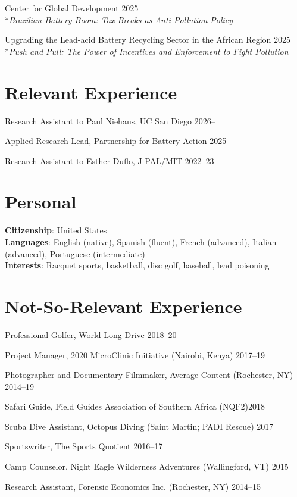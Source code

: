 \documentclass[12pt]{article}
\newcommand{\indentedline}[1]{%
    \\*\setlength{\parindent}{2em}\indent#1\setlength{\parindent}{0pt}%
    \vspace{0.5\baselineskip}%
}
\begin{document}
Center for Global Development \hfill 2025
\indentedline{\textit{Brazilian Battery Boom: Tax Breaks as Anti-Pollution Policy}}

Upgrading the Lead-acid Battery Recycling Sector in the African Region \hfill 2025
\indentedline{\textit{Push and Pull: The Power of Incentives and Enforcement to Fight Pollution}}

\section*{Relevant Experience}
Research Assistant to Paul Niehaus, UC San Diego \hfill 2026--

Applied Research Lead, Partnership for Battery Action \hfill 2025--

Research Assistant to Esther Duflo, J-PAL/MIT \hfill 2022--23

\section*{Personal}
\textbf{Citizenship}: United States\\
\textbf{Languages}: English (native), Spanish (fluent), French (advanced), Italian (advanced), Portuguese (intermediate)\\
\textbf{Interests}: Racquet sports, basketball, disc golf, baseball, lead poisoning

\section*{Not-So-Relevant Experience}
Professional Golfer, World Long Drive \hfill 2018--20

Project Manager, 2020 MicroClinic Initiative (Nairobi, Kenya) \hfill 2017--19

Photographer and Documentary Filmmaker, Average Content (Rochester, NY) \hfill 2014--19

Safari Guide, Field Guides Association of Southern Africa (NQF2)\hfill 2018

Scuba Dive Assistant, Octopus Diving (Saint Martin; PADI Rescue) \hfill 2017

Sportswriter, The Sports Quotient \hfill 2016--17

Camp Counselor, Night Eagle Wilderness Adventures (Wallingford, VT) \hfill 2015

Research Assistant, Forensic Economics Inc. (Rochester, NY) \hfill 2014--15
\end{document}
